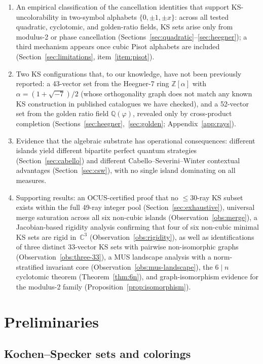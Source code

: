 \documentclass[12pt,a4paper]{article}
\newcommand{\C}{\mathbb{C}}
\newcommand{\Z}{\mathbb{Z}}
\newcommand{\Q}{\mathbb{Q}}
\begin{document}
\begin{enumerate}[label=(\roman*)]
    \item An empirical classification of the cancellation identities that support KS-un\-color\-ability in two-symbol alphabets $\{0, \pm 1, \pm x\}$: across all tested quadratic, cyclotomic, and golden-ratio fields, KS sets arise only from modulus-2 or phase cancellation (Sections~\ref{sec:quadratic}--\ref{sec:heegner}); a third mechanism appears once cubic Pisot alphabets are included (Section~\ref{sec:limitations}, item~\ref{item:pisot}).
    \item Two KS configurations that, to our knowledge, have not been previously reported: a 43-vector set from the Heegner-7 ring $\Z[\alpha]$ with $\alpha = (1{+}\sqrt{-7})/2$ (whose orthogonality graph does not match any known KS construction in published catalogues we have checked), and a 52-vector set from the golden ratio field $\Q(\varphi)$, revealed only by cross-product completion (Sections~\ref{sec:heegner},~\ref{sec:golden}; Appendix~\ref{app:rays}).
    \item Evidence that the algebraic substrate has operational consequences: different islands yield different bipartite perfect quantum strategies (Section~\ref{sec:cabello}) and different Cabello--Severini--Winter contextual advantages (Section~\ref{sec:csw}), with no single island dominating on all measures.
    \item Supporting results: an OCUS-certified proof that no $\leq 30$-ray KS subset exists within the full 49-ray integer pool (Section~\ref{sec:exhaustive}), universal merge saturation across all six non-cubic islands (Observation~\ref{obs:merge}), a Jacobian-based rigidity analysis confirming that four of six non-cubic minimal KS sets are rigid in~$\C^3$ (Observation~\ref{obs:rigidity}), as well as identifications of three distinct 33-vector KS sets with pairwise non-isomorphic graphs (Observation~\ref{obs:three-33}), a MUS landscape analysis with a norm-stratified invariant core (Observation~\ref{obs:mus-landscape}), the $6 \mid n$ cyclotomic theorem (Theorem~\ref{thm:6n}), and graph-isomorphism evidence for the modulus-2 family (Proposition~\ref{prop:isomorphism}).
\end{enumerate}

\section{Preliminaries}\label{sec:prelim}

\subsection{Kochen--Specker sets and colorings}
\end{document}

